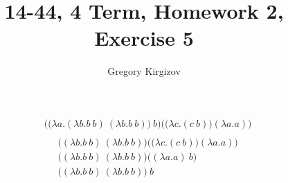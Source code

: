 \documentclass[12pt, leqno]{article}
\author{Gregory Kirgizov}
\title{14-44, 4 Term, Homework 2, Exercise 5}
\date{}
\begin{document}
\maketitle

\begin{align*}
& \Big( \big( \lambda a.( \lambda b.b~b )~( \lambda b.b~b ) \big)~b \Big) \Big( \big( \lambda c.(c~b) \big) ( \lambda a.a) \Big) \\
\end{align*}
\begin{align}
& \big( ( \lambda b.b~b )~( \lambda b.b~b ) \big) \Big( \big( \lambda c.(c~b) \big) ( \lambda a.a) \Big) \\ 
& \big( ( \lambda b.b~b )~( \lambda b.b~b ) \big) \big( ( \lambda a.a)~b \big) \\
& \big( ( \lambda b.b~b )~( \lambda b.b~b ) \big)~b 
\end{align}
\end{document}
